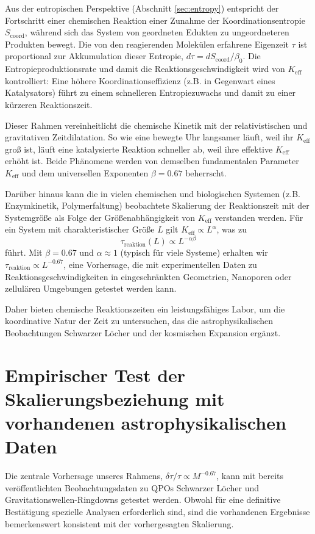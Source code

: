 \documentclass[12pt,a4paper]{article}
\newcommand{\Keff}{K_{\mathrm{eff}}}
\newcommand{\Scoord}{S_{\mathrm{coord}}}
\begin{document}
	Aus der entropischen Perspektive (Abschnitt \ref{sec:entropy}) entspricht der Fortschritt einer chemischen Reaktion einer Zunahme der Koordinationsentropie \(\Scoord\), während sich das System von geordneten Edukten zu ungeordneteren Produkten bewegt. Die von den reagierenden Molekülen erfahrene Eigenzeit \(\tau\) ist proportional zur Akkumulation dieser Entropie, \(d\tau = d\Scoord / \beta_0\). Die Entropieproduktionsrate und damit die Reaktionsgeschwindigkeit wird von \(\Keff\) kontrolliert: Eine höhere Koordinationseffizienz (z.B. in Gegenwart eines Katalysators) führt zu einem schnelleren Entropiezuwachs und damit zu einer kürzeren Reaktionszeit.
	
	Dieser Rahmen vereinheitlicht die chemische Kinetik mit der relativistischen und gravitativen Zeitdilatation. So wie eine bewegte Uhr langsamer läuft, weil ihr \(\Keff\) groß ist, läuft eine katalysierte Reaktion schneller ab, weil ihre effektive \(\Keff\) erhöht ist. Beide Phänomene werden von demselben fundamentalen Parameter \(\Keff\) und dem universellen Exponenten \(\beta = 0.67\) beherrscht.
	
	Darüber hinaus kann die in vielen chemischen und biologischen Systemen (z.B. Enzymkinetik, Polymerfaltung) beobachtete Skalierung der Reaktionszeit mit der Systemgröße als Folge der Größenabhängigkeit von \(\Keff\) verstanden werden. Für ein System mit charakteristischer Größe \(L\) gilt \(\Keff \propto L^{\alpha}\), was zu
	\begin{equation}
		\tau_{\mathrm{reaktion}}(L) \propto L^{-\alpha\beta}
	\end{equation}
	führt. Mit \(\beta = 0.67\) und \(\alpha \approx 1\) (typisch für viele Systeme) erhalten wir \(\tau_{\mathrm{reaktion}} \propto L^{-0.67}\), eine Vorhersage, die mit experimentellen Daten zu Reaktionsgeschwindigkeiten in eingeschränkten Geometrien, Nanoporen oder zellulären Umgebungen getestet werden kann.
	
	Daher bieten chemische Reaktionszeiten ein leistungsfähiges Labor, um die koordinative Natur der Zeit zu untersuchen, das die astrophysikalischen Beobachtungen Schwarzer Löcher und der kosmischen Expansion ergänzt.
	
	\section{Empirischer Test der Skalierungsbeziehung mit vorhandenen astrophysikalischen Daten}
	\label{sec:empirical_test}
	
	Die zentrale Vorhersage unseres Rahmens, \(\delta\tau/\tau \propto M^{-0.67}\), kann mit bereits veröffentlichten Beobachtungsdaten zu QPOs Schwarzer Löcher und Gravitationswellen-Ringdowns getestet werden. Obwohl für eine definitive Bestätigung spezielle Analysen erforderlich sind, sind die vorhandenen Ergebnisse bemerkenswert konsistent mit der vorhergesagten Skalierung.
	
\end{document}
